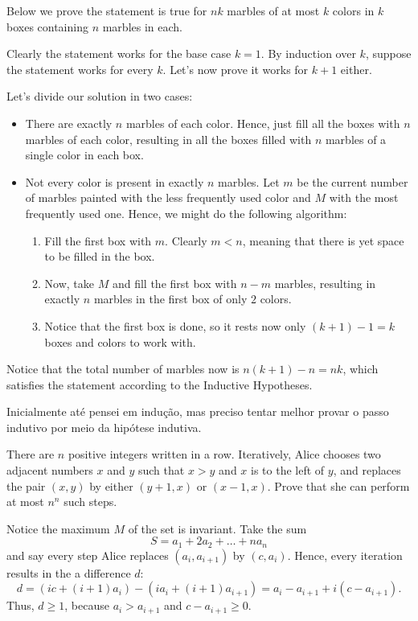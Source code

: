 Below we prove the statement is true for $nk$ marbles of at most $k$ colors in $k$ boxes containing $n$ marbles in each.

Clearly the statement works for the base case $k=1$. By induction over $k$, suppose the statement works for every $k$. Let's now prove it
works for $k+1$ either.

Let's divide our solution in two cases:
\begin{itemize}
	\item There are exactly $n$ marbles of each color. Hence, just fill all the boxes with $n$ marbles
	      of each color, resulting in all the boxes filled with $n$ marbles of a single color in each box.
	\item Not every color is present in exactly $n$ marbles. Let $m$ be the current number of marbles painted
	      with the less frequently used color and $M$ with the most frequently used one. Hence, we
	      might do the following algorithm:
	      \begin{enumerate}
		      \item Fill the first box with $m$. Clearly $m < n$, meaning that there is yet space to be filled in the box.
		      \item Now, take $M$ and fill the first box with $n-m$ marbles, resulting in exactly $n$ marbles in the first box of only $2$ colors.
		      \item Notice that the first box is done, so it rests now only $(k+1)-1=k$ boxes and colors to work with.
	      \end{enumerate}
\end{itemize}
Notice that the total number of marbles now is $n(k+1)-n=nk$, which satisfies the statement according to the Inductive Hypotheses.

\begin{insight}
	Inicialmente até pensei em indução, mas preciso tentar melhor provar o passo indutivo por meio da hipótese indutiva.
\end{insight}

\clearpage

\begin{problem}
There are $n$ positive integers written in a row.
Iteratively, Alice chooses two adjacent numbers $x$ and $y$
such that $x>y$ and $x$ is to the left of $y$,
and replaces the pair $(x,y)$ by either $(y+1,x)$ or $(x-1,x)$.
Prove that she can perform at most $n^n$ such steps.
\end{problem}
Notice the maximum $M$ of the set is invariant. Take the sum
\[
	S=a_1+2a_2+\dots+na_n
\]
and say every step Alice replaces $(a_i,a_{i+1})$ by $(c,a_i)$. Hence,
every iteration results in the a difference $d$:
\[
	d=(ic+(i+1)a_i)-(ia_i+(i+1)a_{i+1})=a_i-a_{i+1}+i(c-a_{i+1}).
\]
Thus, $d \ge 1$, because $a_i > a_{i+1}$ and $c-a_{i+1} \ge 0$.

